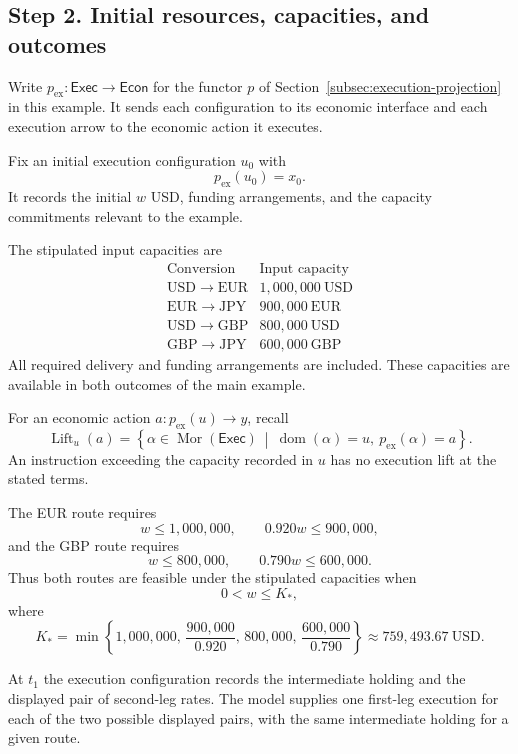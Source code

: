\documentclass[11pt,a4paper]{article}
\newcommand{\Econ}{\mathsf{Econ}}
\begin{document}
\subsection{Step 2. Initial resources, capacities, and outcomes}

Write $p_{\mathrm{ex}}:\mathsf{Exec}\to\Econ$ for the functor $p$
of Section~\ref{subsec:execution-projection} in this example. It sends each configuration to its
economic interface and each execution arrow to the economic action
it executes.

Fix an initial execution configuration $u_0$ with
\[
  p_{\mathrm{ex}}(u_0)=x_0.
\]
It records the initial $w$ USD, funding arrangements, and the
capacity commitments relevant to the example.

The stipulated input capacities are
\[
\begin{array}{c|r}
\text{Conversion}&\text{Input capacity}\\ \hline
\mathrm{USD}\to\mathrm{EUR}
  &1{,}000{,}000\ \mathrm{USD}\\
\mathrm{EUR}\to\mathrm{JPY}
  &900{,}000\ \mathrm{EUR}\\
\mathrm{USD}\to\mathrm{GBP}
  &800{,}000\ \mathrm{USD}\\
\mathrm{GBP}\to\mathrm{JPY}
  &600{,}000\ \mathrm{GBP}
\end{array}
\]
All required delivery and funding arrangements are included.
These capacities are available in both outcomes of the main example.

For an economic action $a:p_{\mathrm{ex}}(u)\to y$, recall
\[
  \operatorname{Lift}_u(a)
  =
  \left\{
    \alpha\in\operatorname{Mor}(\mathsf{Exec})
    \ \middle|\
    \operatorname{dom}(\alpha)=u,\ 
    p_{\mathrm{ex}}(\alpha)=a
  \right\}.
\]
An instruction exceeding the capacity recorded in $u$ has no
execution lift at the stated terms.

The EUR route requires
\[
  w\leq1{,}000{,}000,
  \qquad
  0.920w\leq900{,}000,
\]
and the GBP route requires
\[
  w\leq800{,}000,
  \qquad
  0.790w\leq600{,}000.
\]
Thus both routes are feasible under the stipulated capacities when
\[
  0<w\leq K_*,
\]
where
\[
  K_*=
  \min\left\{
    1{,}000{,}000,\,
    \frac{900{,}000}{0.920},\,
    800{,}000,\,
    \frac{600{,}000}{0.790}
  \right\}
  \approx759{,}493.67\ \mathrm{USD}.
\]

At $t_1$ the execution configuration records the intermediate holding
and the displayed pair of second-leg rates. The model supplies one
first-leg execution for each of the two possible displayed pairs, with
the same intermediate holding for a given route.
\end{document}
